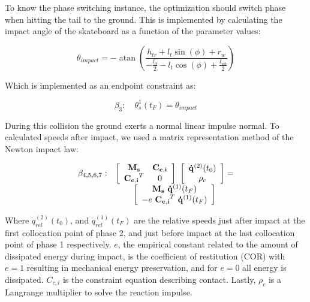 \documentclass[default,iicol]{sn-jnl}
\begin{document}
To know the phase switching instance, the optimization should switch phase when hitting the tail to the ground. This is implemented by calculating the impact angle of the skateboard as a function of the parameter values:

\begin{equation}
    \theta_{impact} = -\operatorname{atan}\left(\frac{h_{t r}+l_t \sin (\phi)+r_w}{-\frac{l_d}{2}-l_t \cos (\phi)+\frac{l_{w b}}{2}}\right)
\end{equation}

Which is implemented as an endpoint constraint as:

\begin{equation}
    \beta_3: \quad \theta_s^{1}(t_F) = \theta_{impact}
\end{equation}

During this collision the ground exerts a normal linear impulse normal. To calculated speeds after impact, we used a matrix representation method of the Newton impact law\cite{vallery_heike_advanced_2018}:

\begin{equation}
\begin{array}{l c}
    \beta_{4,5,6,7}: & \left[\begin{array}{cc}
        \mathbf{M_s} & \mathbf{C_{c,i}} \\
        \mathbf{C_{c,i}}^T & 0
    \end{array} \right]\
    \left[\begin{array}{c}
       \mathbf{\dot q}^{(2)}(t_0)  \\
        \rho_c 
    \end{array}\right] =
     \\ &  
     \left[\begin{array}{c}
         \mathbf{M_s}\ \mathbf{\dot q}^{(1)}(t_F)   \\
         -e\ \mathbf{C_{c,i}}^T\ \mathbf{\dot q}^{(1)}(t_F)
    \end{array}\right]
    \end{array}
\end{equation}

Where $\dot q_{rel}^{(2)}(t_0)$, and $\dot q_{rel}^{(1)}(t_F)$ are the relative speeds just after impact at the first collocation point of phase 2, and just before impact at the last collocation point of phase 1 respectively.  $e$, the empirical constant related to the amount of dissipated energy during impact, is the coefficient of restitution (COR) with $e=1$ resulting in mechanical energy preservation, and for $e=0$ all energy is dissipated. $C_{c,i}$ is the constraint equation describing contact. Lastly, $\rho_c$ is a Langrange multiplier to solve the reaction impulse.
\end{document}
